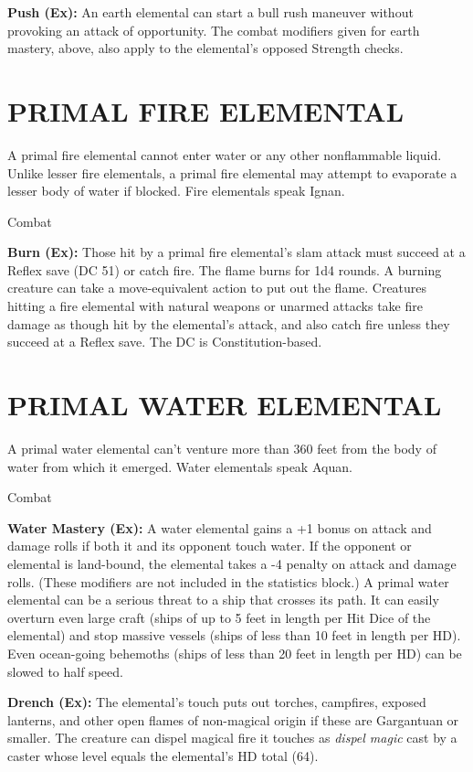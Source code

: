 \documentclass{article}
\begin{document}
\textbf{Push (Ex):} An earth elemental can start a bull rush maneuver without provoking 
an attack of opportunity. The combat modifiers given for earth mastery, above, 
also apply to the elemental's opposed Strength checks. 

\section*{PRIMAL FIRE ELEMENTAL }

A primal fire elemental cannot enter water or any other nonflammable liquid. Unlike 
lesser fire elementals, a primal fire elemental may attempt to evaporate a lesser 
body of water if blocked. Fire elementals speak Ignan. 

Combat\textbf{ }

\textbf{Burn (Ex):} Those hit by a primal fire elemental's slam attack must succeed 
at a Reflex save (DC 51) or catch fire. The flame burns for 1d4 rounds. A burning 
creature can take a move-equivalent action to put out the flame. Creatures hitting 
a fire elemental with natural weapons or unarmed attacks take fire damage as though 
hit by the elemental's attack, and also catch fire unless they succeed at a Reflex 
save. The DC is Constitution-based.

\section*{PRIMAL WATER ELEMENTAL }

A primal water elemental can't venture more than 360 feet from the body of water 
from which it emerged. Water elementals speak Aquan. 

Combat\textbf{ }

\textbf{Water Mastery (Ex):} A water elemental gains a +1 bonus on attack and damage 
rolls if both it and its opponent touch water. If the opponent or elemental is 
land-bound, the elemental takes a -4 penalty on attack and damage rolls. (These 
modifiers are not included in the statistics block.) A primal water elemental can 
be a serious threat to a ship that crosses its path. It can easily overturn even 
large craft (ships of up to 5 feet in length per Hit Dice of the elemental) and 
stop massive vessels (ships of less than 10 feet in length per HD). Even ocean-going 
behemoths (ships of less than 20 feet in length per HD) can be slowed to half speed. 

\textbf{Drench (Ex):} The elemental's touch puts out torches, campfires, exposed 
lanterns, and other open flames of non-magical origin if these are Gargantuan or 
smaller. The creature can dispel magical fire it touches as \textit{dispel magic 
}cast by a caster whose level equals the elemental's HD total (64). 
\end{document}
